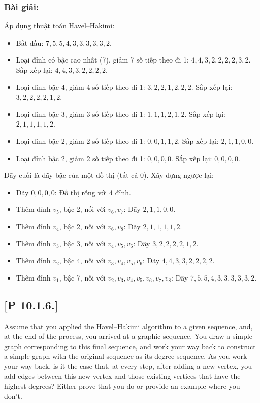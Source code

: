 \documentclass[a4paper,12pt]{article}
\begin{document}
\subsubsection*{Bài giải:}
Áp dụng thuật toán Havel–Hakimi:
\begin{itemize}
    \item Bắt đầu: \( 7, 5, 5, 4, 3, 3, 3, 3, 3, 2 \).
    \item Loại đỉnh có bậc cao nhất (7), giảm 7 số tiếp theo đi 1: \( 4, 4, 3, 2, 2, 2, 2, 3, 2 \). Sắp xếp lại: \( 4, 4, 3, 3, 2, 2, 2, 2 \).
    \item Loại đỉnh bậc 4, giảm 4 số tiếp theo đi 1: \( 3, 2, 2, 1, 2, 2, 2 \). Sắp xếp lại: \( 3, 2, 2, 2, 2, 1, 2 \).
    \item Loại đỉnh bậc 3, giảm 3 số tiếp theo đi 1: \( 1, 1, 1, 2, 1, 2 \). Sắp xếp lại: \( 2, 1, 1, 1, 1, 2 \).
    \item Loại đỉnh bậc 2, giảm 2 số tiếp theo đi 1: \( 0, 0, 1, 1, 2 \). Sắp xếp lại: \( 2, 1, 1, 0, 0 \).
    \item Loại đỉnh bậc 2, giảm 2 số tiếp theo đi 1: \( 0, 0, 0, 0 \). Sắp xếp lại: \( 0, 0, 0, 0 \).
\end{itemize}
Dãy cuối là dãy bậc của một đồ thị (tất cả 0). Xây dựng ngược lại:
\begin{itemize}
    \item Dãy \( 0, 0, 0, 0 \): Đồ thị rỗng với 4 đỉnh.
    \item Thêm đỉnh \( v_5 \), bậc 2, nối với \( v_6, v_7 \): Dãy \( 2, 1, 1, 0, 0 \).
    \item Thêm đỉnh \( v_4 \), bậc 2, nối với \( v_6, v_8 \): Dãy \( 2, 1, 1, 1, 1, 2 \).
    \item Thêm đỉnh \( v_3 \), bậc 3, nối với \( v_4, v_5, v_6 \): Dãy \( 3, 2, 2, 2, 2, 1, 2 \).
    \item Thêm đỉnh \( v_2 \), bậc 4, nối với \( v_3, v_4, v_5, v_6 \): Dãy \( 4, 4, 3, 3, 2, 2, 2, 2 \).
    \item Thêm đỉnh \( v_1 \), bậc 7, nối với \( v_2, v_3, v_4, v_5, v_6, v_7, v_8 \): Dãy \( 7, 5, 5, 4, 3, 3, 3, 3, 3, 2 \).
\end{itemize}

\subsection*{[P 10.1.6.]} Assume that you applied the Havel–Hakimi algorithm to a given sequence, and, at the end of the process, you arrived at a graphic sequence. You draw a simple graph corresponding to this final sequence, and work your way back to construct a simple graph with the original sequence as its degree sequence. As you work your way back, is it the case that, at every step, after adding a new vertex, you add edges between this new vertex and those existing vertices that have the highest degrees? Either prove that you do or provide an example where you don’t.
\end{document}
